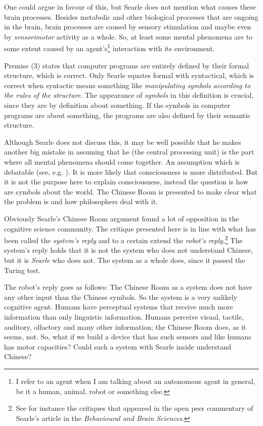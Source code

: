 One could argue in favour of this, but Searle does not mention what causes these brain processes. Besides metabolic and other biological processes that are ongoing in the brain, brain processes are caused by sensory stimulation and maybe even by {\em sensorimotor} activity as a whole. So, at least some mental phenomena are to some extent caused by an agent's\footnote{I refer to an agent when I am talking about an autonomous agent in general, be it a human, animal, robot or something else.} interaction with its environment.

Premise (3) states that computer programs are entirely defined by their formal structure, which is correct. Only Searle equates formal with syntactical, which is correct when syntactic means something like {\em manipulating symbols according to the rules of the structure}. The appearance of {\em symbols} in this definition is crucial, since they are by definition about something. If the symbols in computer programs are about something, the programs are also defined by their semantic structure.

Although Searle does not discuss this, it may be well possible that he makes another big mistake in assuming that he (the central processing unit) is the part where all mental phenomena should come together. An assumption which is debatable (see, e.g. \citealt{dennett:1991,edelman:1992}). It is more likely that consciousness is more distributed. But it is not the purpose here to explain consciousness, instead the question is how are symbols about the world. The Chinese Room is presented to make clear what the problem is and how philosophers deal with it.

Obviously Searle's Chinese Room argument found a lot of opposition in the cognitive science community. The critique presented here is in line with what has been called the {\em system's reply} and to a certain extend the {\em robot's reply}.\footnote{See for instance the critiques that appeared in the open peer commentary of Searle's \citeyear{searle:1980} article in the {\it Behavioural and Brain Sciences}.} The system's reply holds that it is not the system who does not understand Chinese, but it is {\em Searle} who does not. The system as a whole does, since it passed the Turing test. 

The robot's reply goes as follows: The Chinese Room as a system does not have any other input than the Chinese symbols. So the system is a very unlikely cognitive agent. Humans have perceptual systems that receive much more information than only linguistic information. Humans perceive visual, tactile, auditory, olfactory and many other information; the Chinese Room does, as it seems, not. So, what if we build a device that has such sensors and like humans has motor capacities? Could such a system with Searle inside understand Chinese?

